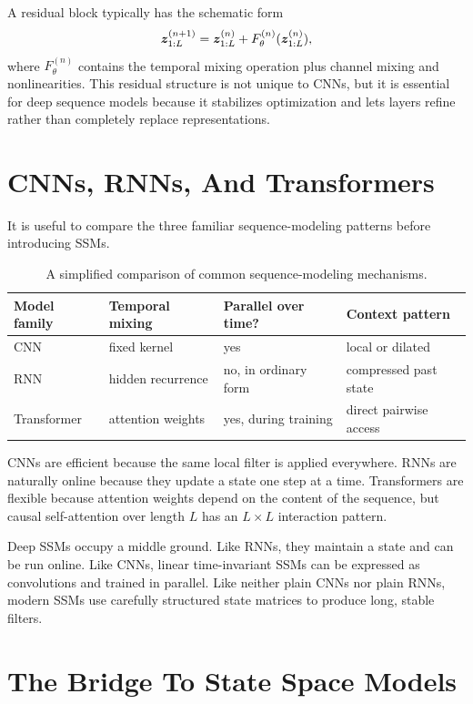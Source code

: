 A residual block typically has the schematic form
\[
  \bm{z}_{1:L}^{(n+1)}
  =
  \bm{z}_{1:L}^{(n)}
  +
  F_{\theta}^{(n)}(\bm{z}_{1:L}^{(n)}),
\]
where $F_{\theta}^{(n)}$ contains the temporal mixing operation plus channel mixing and
nonlinearities. This residual structure is not unique to CNNs, but it is essential for
deep sequence models because it stabilizes optimization and lets layers refine rather
than completely replace representations.

\section{CNNs, RNNs, And Transformers}

It is useful to compare the three familiar sequence-modeling patterns before introducing
SSMs.

\begin{table}[h]
\centering
\begin{tabular}{llll}
\toprule
Model family & Temporal mixing & Parallel over time? & Context pattern \\
\midrule
CNN & fixed kernel & yes & local or dilated \\
RNN & hidden recurrence & no, in ordinary form & compressed past state \\
Transformer & attention weights & yes, during training & direct pairwise access \\
\bottomrule
\end{tabular}
\caption{A simplified comparison of common sequence-modeling mechanisms.}
\label{tab:cnn-rnn-transformer}
\end{table}

CNNs are efficient because the same local filter is applied everywhere. RNNs are naturally
online because they update a state one step at a time. Transformers are flexible because
attention weights depend on the content of the sequence, but causal self-attention over
length $L$ has an $L \times L$ interaction pattern.

Deep SSMs occupy a middle ground. Like RNNs, they maintain a state and can be run online.
Like CNNs, linear time-invariant SSMs can be expressed as convolutions and trained in
parallel. Like neither plain CNNs nor plain RNNs, modern SSMs use carefully structured
state matrices to produce long, stable filters.

\section{The Bridge To State Space Models}


